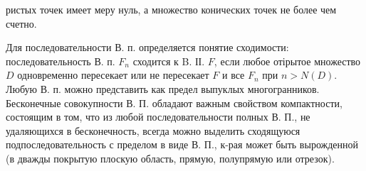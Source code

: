 \documentclass[10pt]{article}
\begin{document}
ристых точек имеет меру нуль, а множество конических точек не более чем счетно.



Для последовательности В. п. определяется понятие сходимости: последовательность В. п. $F_{n}$ сходится к B. ІІ. $F$, если любое отірытое множество $D$ одновременно пересекает или не пересекает $F$ и все $F_{n}$ при $n>N(D)$. Любую В. п. можно представить как предел выпуклых многогранников. Бесконечные совокупности В. П. обладают важным свойством компактности, состоящим в том, что из любой последовательности полных В. П., не удаляющихся в бесконечность, всегда можно выделить сходящуюся подпоследовательность с пределом в виде В. П., к-рая может быть вырожденной (в дважды покрытую плоскую область, прямую, полупрямую или отрезок).
\end{document}
